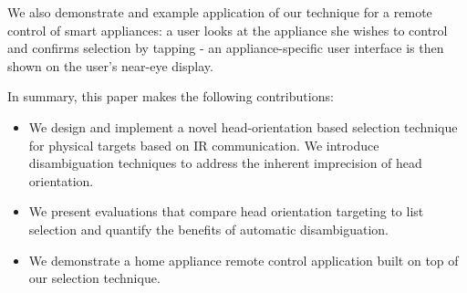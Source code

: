 We also demonstrate and example application of our technique for a remote control of smart appliances: a user looks at the appliance she wishes to control and confirms selection by tapping - an appliance-specific user interface is then shown on the user's near-eye display.




In summary, this paper makes the following contributions:
\begin{itemize}
\item We design and implement a novel head-orientation based selection technique for physical targets based on IR communication. We introduce disambiguation techniques to address the inherent imprecision of head orientation.
\item We present evaluations that compare head orientation targeting to list selection and quantify the benefits of automatic disambiguation.
\item We demonstrate a home appliance remote control application built on top of our selection technique.
\end{itemize}


